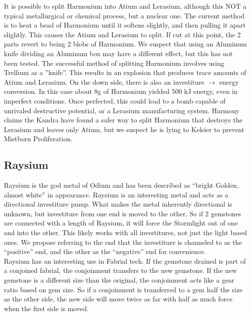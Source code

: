 \documentclass[conference]{IEEEtran}
\begin{document}
It is possible to split Harmonium into Atium and Lerasium,\cite{TLM-CH71} although this NOT a typical metallurgical or chemical process, but a nuclear one.
\cite{TLM-CH17} The current method is to heat a bead of Harmonium until it softens slightly, and then pulling it apart slightly.  This causes the Atium and Lerasium to split.  If cut at this point, the 2 parts revert to being 2 blobs of Harmonium.\cite{TLM-CH16}  We suspect that using an Aluminum knife dividing an Aluminum box may have a different effect, but this has not been tested.  The successful method of splitting Harmonium involves using Trellium as a ''knife''.\cite{TLM-CH16}  This results in an explosion that produces trace amounts of Atium and Lerasium.\cite{TLM-CH17}\cite{TLM-CH71}  On the down side, there is also an investiture $\rightarrow$ energy conversion.  In this case about 8g of Harmonium yielded 500 kJ energy, even in imperfect conditions.  Once perfected, this could lead to a bomb capable of unrivaled destructive potential,\cite{TLM-CH71} or a Lerasium manufacturing system.  Harmony claims the Kandra have found a safer way to split Harmonium that destroys the Lerasium and leaves only Atium,\cite{TLM-3WAD} but we suspect he is lying to Kelsier to prevent Mistborn Proliferation.


\subsection*{\textbf{Raysium}\cite{rayse}}
Raysium is the god metal of Odium and has been described as ``bright Golden, almost white'' in appearance.\cite{RoW-CH84}  Raysium is an interesting metal and acts as a directional investiture pump.  What makes the metal inherently directional is unknown, but investiture from one end is moved to the other.  So if 2 gemstones are connected with a length of Raysium, it will force the Stormlight out of one and into the other.  This likely works with all investitures, not just the light based ones.\cite{RoW-CH84}  We propose referring to the end that the investiture is channeled to as the ``positive'' end, and the other as the ``negative'' end for convenience.\\

Raysium has an interesting use in Fabrial tech.  If the gemstone drained is part of a conjoined fabrial, the conjoinment transfers to the new gemstone.  If the new gemstone is a different size than the original, the conjoinment acts like a gear ratio based on gem size.  So if a conjoinment is transferred to a gem half the size as the other side, the new side will move twice as far with half as much force when the first side is moved.\cite{RoW-CH84}\\
\end{document}
